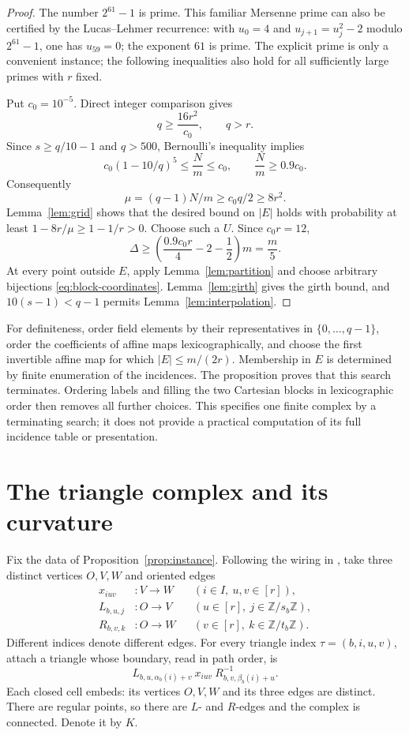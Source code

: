 \documentclass[11pt]{amsart}
\theoremstyle{definition}
\theoremstyle{remark}
\numberwithin{equation}{section}
\newcommand{\Z}{\mathbb Z}
\begin{document}
\begin{proof}
The number $2^{61}-1$ is prime. This familiar Mersenne prime can
also be certified by the Lucas--Lehmer recurrence: with $u_0=4$ and
$u_{j+1}=u_j^2-2$ modulo $2^{61}-1$, one has $u_{59}=0$; the
exponent $61$ is prime. The explicit prime is only a convenient
instance; the following inequalities also hold for all sufficiently
large primes with $r$ fixed.

Put $c_0=10^{-5}$. Direct integer comparison gives
\[
 q\ge\frac{16r^2}{c_0},\qquad q>r.
\]
Since $s\ge q/10-1$ and $q>500$, Bernoulli's inequality implies
\[
 c_0(1-10/q)^5\le\frac Nm\le c_0,
 \qquad \frac Nm\ge0.9c_0.
\]
Consequently
\[
 \mu=(q-1)N/m\ge c_0q/2\ge8r^2.
\]
Lemma~\ref{lem:grid} shows that the desired bound on $|E|$ holds
with probability at least $1-8r/\mu\ge1-1/r>0$. Choose such a $U$.
Since $c_0r=12$,
\[
 \Delta\ge\left(\frac{0.9c_0r}{4}-2-\frac12\right)m
 =\frac m5.
\]
At every point outside $E$, apply Lemma~\ref{lem:partition} and
choose arbitrary bijections \eqref{eq:block-coordinates}.
Lemma~\ref{lem:girth} gives the girth bound, and
$10(s-1)<q-1$ permits Lemma~\ref{lem:interpolation}.
\end{proof}

For definiteness, order field elements by their representatives in
$\{0,\ldots,q-1\}$, order the coefficients of affine maps
lexicographically, and choose the first invertible affine map for
which $|E|\le m/(2r)$. Membership in $E$ is determined by finite
enumeration of the incidences. The proposition proves that this
search terminates. Ordering labels and filling the two Cartesian
blocks in lexicographic order then removes all further choices.
This specifies one finite complex by a terminating search; it does
not provide a practical computation of its full incidence table or
presentation.

\section{The triangle complex and its curvature}\label{sec:geometry}

Fix the data of Proposition~\ref{prop:instance}. Following the
wiring in \cite{OA252}, take three distinct vertices $O,V,W$ and
oriented edges
\begin{align*}
 x_{iuv}&:V\longrightarrow W
       &&(i\in I,\ u,v\in[r]),\\
 L_{b,u,j}&:O\longrightarrow V
       &&(u\in[r],\ j\in\Z/s_b\Z),\\
 R_{b,v,k}&:O\longrightarrow W
       &&(v\in[r],\ k\in\Z/t_b\Z).
\end{align*}
Different indices denote different edges. For every triangle index
$\tau=(b,i,u,v)$, attach a triangle whose boundary, read in path
order, is
\begin{equation}\label{eq:triangle-word}
 L_{b,u,\alpha_b(i)+v}\ x_{iuv}\ R_{b,v,\beta_b(i)+u}^{-1}.
\end{equation}
Each closed cell embeds: its vertices $O,V,W$ and its three edges
are distinct. There are regular points, so there are $L$- and
$R$-edges and the complex is connected. Denote it by $K$.
\end{document}
